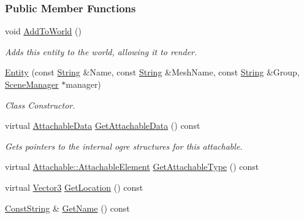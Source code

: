\subsubsection*{Public Member Functions}
\begin{DoxyCompactItemize}
\item 
void \hyperlink{classMezzanine_1_1Entity_add48bc9fd02f427e271392597b9dad9f}{AddToWorld} ()
\begin{DoxyCompactList}\small\item\em Adds this entity to the world, allowing it to render. \item\end{DoxyCompactList}\item 
\hyperlink{classMezzanine_1_1Entity_a50fb69d94709026fc524cd0cbe3671b8}{Entity} (const \hyperlink{namespaceMezzanine_acf9fcc130e6ebf08e3d8491aebcf1c86}{String} \&Name, const \hyperlink{namespaceMezzanine_acf9fcc130e6ebf08e3d8491aebcf1c86}{String} \&MeshName, const \hyperlink{namespaceMezzanine_acf9fcc130e6ebf08e3d8491aebcf1c86}{String} \&Group, \hyperlink{classMezzanine_1_1SceneManager}{SceneManager} $\ast$manager)
\begin{DoxyCompactList}\small\item\em Class Constructor. \item\end{DoxyCompactList}\item 
virtual \hyperlink{structMezzanine_1_1AttachableData}{AttachableData} \hyperlink{classMezzanine_1_1Entity_aba46f276ebfd6fcd29d2475c956f5ca8}{GetAttachableData} () const 
\begin{DoxyCompactList}\small\item\em Gets pointers to the internal ogre structures for this attachable. \item\end{DoxyCompactList}\item 
virtual \hyperlink{classMezzanine_1_1Attachable_a274bd45f9666f6e50f6fdd8a0162bc9e}{Attachable::AttachableElement} \hyperlink{classMezzanine_1_1Entity_aa844898af2b3d97593a414c8999b7e02}{GetAttachableType} () const 
\item 
virtual \hyperlink{classMezzanine_1_1Vector3}{Vector3} \hyperlink{classMezzanine_1_1Entity_abef3e9fd62085c0ebc0bcab8199f7ce7}{GetLocation} () const 
\item 
\hyperlink{namespaceMezzanine_a63cd699ac54b73953f35ec9cfc05e506}{ConstString} \& \hyperlink{classMezzanine_1_1Entity_aa1bf505993225def530582741e4e58c4}{GetName} () const 
\item 

\end{DoxyCompactItemize}
